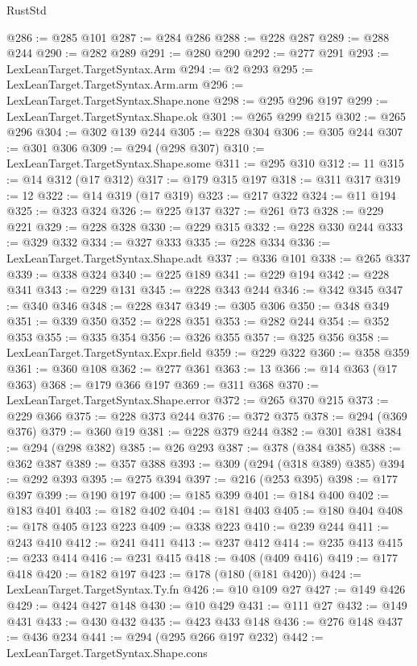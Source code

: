 \begin{lexlean}{RustStd}
\begin{coremodule}
@286 := @285 @101
@287 := @284 @286
@288 := @228 @287
@289 := @288 @244
@290 := @282 @289
@291 := @280 @290
@292 := @277 @291
@293 := LexLeanTarget.TargetSyntax.Arm
@294 := @2 @293
@295 := LexLeanTarget.TargetSyntax.Arm.arm
@296 := LexLeanTarget.TargetSyntax.Shape.none
@298 := @295 @296 @197
@299 := LexLeanTarget.TargetSyntax.Shape.ok
@301 := @265 @299 @215
@302 := @265 @296
@304 := @302 @139 @244
@305 := @228 @304
@306 := @305 @244
@307 := @301 @306
@309 := @294 (@298 @307)
@310 := LexLeanTarget.TargetSyntax.Shape.some
@311 := @295 @310
@312 := 11
@315 := @14 @312 (@17 @312)
@317 := @179 @315 @197
@318 := @311 @317
@319 := 12
@322 := @14 @319 (@17 @319)
@323 := @217 @322
@324 := @11 @194
@325 := @323 @324
@326 := @225 @137
@327 := @261 @73
@328 := @229 @221
@329 := @228 @328
@330 := @229 @315
@332 := @228 @330 @244
@333 := @329 @332
@334 := @327 @333
@335 := @228 @334
@336 := LexLeanTarget.TargetSyntax.Shape.adt
@337 := @336 @101
@338 := @265 @337
@339 := @338 @324
@340 := @225 @189
@341 := @229 @194
@342 := @228 @341
@343 := @229 @131
@345 := @228 @343 @244
@346 := @342 @345
@347 := @340 @346
@348 := @228 @347
@349 := @305 @306
@350 := @348 @349
@351 := @339 @350
@352 := @228 @351
@353 := @282 @244
@354 := @352 @353
@355 := @335 @354
@356 := @326 @355
@357 := @325 @356
@358 := LexLeanTarget.TargetSyntax.Expr.field
@359 := @229 @322
@360 := @358 @359
@361 := @360 @108
@362 := @277 @361
@363 := 13
@366 := @14 @363 (@17 @363)
@368 := @179 @366 @197
@369 := @311 @368
@370 := LexLeanTarget.TargetSyntax.Shape.error
@372 := @265 @370 @215
@373 := @229 @366
@375 := @228 @373 @244
@376 := @372 @375
@378 := @294 (@369 @376)
@379 := @360 @19
@381 := @228 @379 @244
@382 := @301 @381
@384 := @294 (@298 @382)
@385 := @26 @293
@387 := @378 (@384 @385)
@388 := @362 @387
@389 := @357 @388
@393 := @309 (@294 (@318 @389) @385)
@394 := @292 @393
@395 := @275 @394
@397 := @216 (@253 @395)
@398 := @177 @397
@399 := @190 @197
@400 := @185 @399
@401 := @184 @400
@402 := @183 @401
@403 := @182 @402
@404 := @181 @403
@405 := @180 @404
@408 := @178 @405 @123 @223
@409 := @338 @223
@410 := @239 @244
@411 := @243 @410
@412 := @241 @411
@413 := @237 @412
@414 := @235 @413
@415 := @233 @414
@416 := @231 @415
@418 := @408 (@409 @416)
@419 := @177 @418
@420 := @182 @197
@423 := @178 (@180 (@181 @420))
@424 := LexLeanTarget.TargetSyntax.Ty.fn
@426 := @10 @109 @27
@427 := @149 @426
@429 := @424 @427 @148
@430 := @10 @429
@431 := @111 @27
@432 := @149 @431
@433 := @430 @432
@435 := @423 @433 @148
@436 := @276 @148
@437 := @436 @234
@441 := @294 (@295 @266 @197 @232)
@442 := LexLeanTarget.TargetSyntax.Shape.cons

\end{coremodule}
\end{lexlean}
